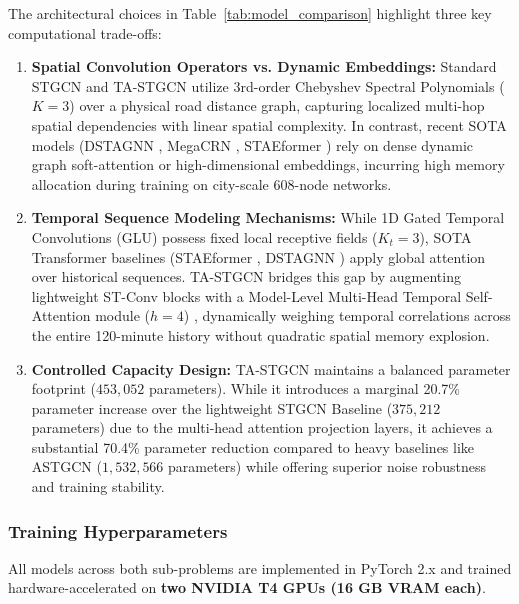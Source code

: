 \documentclass[journal,twocolumn]{IEEEtran}
\begin{document}
The architectural choices in Table~\ref{tab:model_comparison} highlight three key computational trade-offs:
\begin{enumerate}
    \item \textbf{Spatial Convolution Operators vs. Dynamic Embeddings:} Standard STGCN \cite{stgcn} and TA-STGCN utilize 3rd-order Chebyshev Spectral Polynomials ($K=3$) \cite{chebnet} over a physical road distance graph, capturing localized multi-hop spatial dependencies with linear spatial complexity. In contrast, recent SOTA models (DSTAGNN \cite{dstagnn}, MegaCRN \cite{megacrn}, STAEformer \cite{staeformer}) rely on dense dynamic graph soft-attention or high-dimensional embeddings, incurring high memory allocation during training on city-scale 608-node networks.
    \item \textbf{Temporal Sequence Modeling Mechanisms:} While 1D Gated Temporal Convolutions (GLU) \cite{stgcn} possess fixed local receptive fields ($K_t=3$), SOTA Transformer baselines (STAEformer \cite{staeformer}, DSTAGNN \cite{dstagnn}) apply global attention over historical sequences. TA-STGCN bridges this gap by augmenting lightweight ST-Conv blocks with a Model-Level Multi-Head Temporal Self-Attention module ($h=4$) \cite{attention}, dynamically weighing temporal correlations across the entire 120-minute history without quadratic spatial memory explosion.
    \item \textbf{Controlled Capacity Design:} TA-STGCN maintains a balanced parameter footprint ($453,052$ parameters). While it introduces a marginal 20.7\% parameter increase over the lightweight STGCN Baseline ($375,212$ parameters) due to the multi-head attention projection layers, it achieves a substantial 70.4\% parameter reduction compared to heavy baselines like ASTGCN ($1,532,566$ parameters) while offering superior noise robustness and training stability.
\end{enumerate}

\subsubsection{Training Hyperparameters}
All models across both sub-problems are implemented in PyTorch 2.x and trained hardware-accelerated on \textbf{two NVIDIA T4 GPUs (16 GB VRAM each)}.
\end{document}
